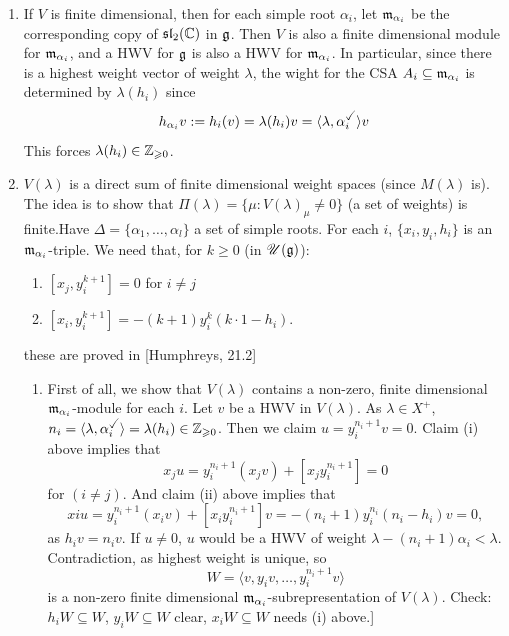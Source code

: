 \documentclass{article}
\begin{document}
\begin{enumerate}
    \item[($\Rightarrow$)] If $V$ is finite dimensional, then for each simple root $\alpha_{i}$, let $\mathfrak{m}_{\alpha_{i}}$ be the corresponding copy of $\mathfrak{sl}_{2}(\mathbb{C})$ in $\mathfrak{g}$. Then $V$ is also a finite dimensional module for $\mathfrak{m}_{\alpha_{i}}$, and a HWV for $\mathfrak{g}$ is also a HWV for $\mathfrak{m}_{\alpha_{i}}$. In particular, since there is a highest weight vector of weight $\lambda$, the wight for the CSA $A_{i} \subseteq \mathfrak{m}_{\alpha_{i}}$ is determined by $\lambda(h_{i})$ since \[ h_{\alpha_{i}}v :=h_{i}(v)=\lambda(h_{i})v = \langle \lambda, \alpha_{i}^{\checked} \rangle v \]
    This forces $\lambda(h_{i}) \in \mathbb{Z}_{\geqslant 0}$.
    \item[($\Leftarrow$)] $V(\lambda)$ is a direct sum of finite dimensional weight spaces (since $M(\lambda)$ is). The idea is to show that $\Pi (\lambda) = \{ \mu : V(\lambda)_{\mu} \neq 0 \} $ (a set of weights) is finite.\gap Have $\Delta = \{ \alpha_{1}, \dots, \alpha_{l} \}$ a set of simple roots. For each $i$, $\{x_{i}, y_{i}, h_{i}\}$ is an $\mathfrak{m}_{\alpha_{i}}$-triple. We need that, for $k \geq 0$ (in $\mathscr{U}(\mathfrak{g})$): \begin{enumerate}
        \item[(i)] $[x_{j}, y_{i}^{k+1}]=0$ for $i \neq j$
        \item[(ii)] $[x_{i}, y_{i}^{k+1}] = -(k+1)y_{i}^{k} (k \cdot 1 - h_{i})$.
    \end{enumerate}
    these are proved in [Humphreys, 21.2]
    \begin{enumerate}
    \item[1.] First of all, we show that $V(\lambda)$ contains a non-zero, finite dimensional $\mathfrak{m}_{\alpha_{i}}$-module for each $i$.\gap 
    Let $v$ be a HWV in $V(\lambda)$. As $\lambda \in X^{+}$, $n_{i} = \langle \lambda, \alpha_{i}^{\checked} \rangle = \lambda(h_{i}) \in \bbZ_{\geq 0}$. Then we claim $u = y_{i}^{n_{i}+1}v = 0$. 
    \gap Claim (i) above implies that \[x_{j}u= y_{i}^{n_{i}+1}(x_{j}v) + [x_{j}y_{i}^{n_{i}+1}] = 0\] for $(i \neq j)$. \gap And claim (ii) above implies that \[x{i}u =y_{i}^{n_{i}+1}(x_{i}v) + [x_{i}y_{i}^{n_{i}+1}]v = -(n_{i} + 1)y_{i}^{n_{i}}(n_{i}-h_{i})v = 0,\] as $h_{i}v = n_{i}v$.\gap  
    If $u \neq 0$, $u$ would be a HWV of weight $\lambda - (n_{i} + 1)\alpha_{i} < \lambda$. Contradiction, as highest weight is unique, so \[W = \langle v, y_{i}v, \dots, y_{i}^{n_{i}+1}v \rangle\] is a non-zero finite dimensional $\mathfrak{m}_{\alpha_{i}}$-subrepresentation of $V(\lambda)$. \gap {[}Check: $h_{i}W \subseteq W$, $y_{i}W \subseteq W$ clear, $x_{i}W \subseteq W$ needs (i) above.{]}

\end{enumerate}
\end{enumerate}
\end{document}
